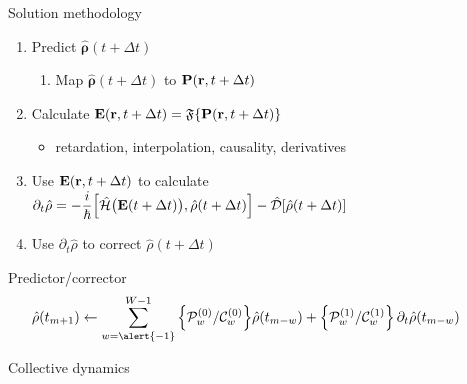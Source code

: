 \documentclass[aspectratio=169]{beamer}
\begin{document}
\begin{frame}{Solution methodology}
  \begin{enumerate}
    \item Predict $\hat{\mathbf{\rho}}(t + \Delta t)$
      \begin{enumerate}
        \item Map $\hat{\mathbf{\rho}}(t + \Delta t)$ to $\vb{P}(\vb{r}, t + \Delta t)$
      \end{enumerate}
    \item Calculate $\vb{E}(\vb{r}, t + \Delta t) = \mathfrak{F}\qty{\vb{P}(\vb{r}, t + \Delta t)}$
      \begin{itemize}
        \item retardation, interpolation, causality, derivatives
      \end{itemize}
    \item Use $\displaystyle \vb{E}(\vb{r}, t + \Delta t)$ to calculate $\displaystyle \partial_t \hat{\rho} = -\frac{i}{\hbar} \commutator{\hat{\mathcal{H}}\qty\big(\vb{E}(t + \Delta t))}{\hat{\rho}(t + \Delta t)} - \hat{\mathcal{D}}\qty[\hat{\rho}(t + \Delta t)]$
    \item Use $\partial_t \hat{\rho}$ to correct $\hat{\rho}(t + \Delta t)$
  \end{enumerate}
  
  \begin{block}{Predictor/corrector}
    \begin{equation*}
    \hat{\rho}(t_{m + 1}) \leftarrow \sum_{w = \alert{-1}}^{W - 1} \qty{\mathcal{P}_{w}^{(0)} / \mathcal{C}_{w}^{(0)}} \hat{\rho}(t_{m-w}) + \qty{\mathcal{P}_{w}^{(1)}/ \mathcal{C}_{w}^{(1)}} \, \partial_t \hat{\rho}(t_{m - w}) \qquad
    \end{equation*}
  \end{block}
\end{frame}


\begin{frame}{Collective dynamics}
  \vspace{0.5cm}
  \begin{center}
    
  \end{center}
\end{frame}
\end{document}
